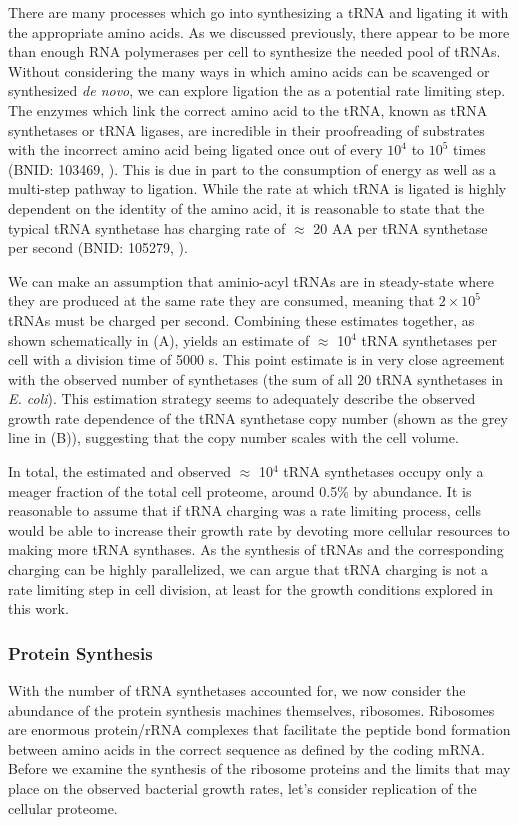 There  are many processes which go into synthesizing a tRNA and ligating it
with the appropriate amino acids. As we discussed previously, there
appear to be more than enough RNA polymerases per cell to synthesize the needed
pool of tRNAs. Without considering the many ways in which amino acids can be
scavenged or synthesized \textit{de novo}, we can explore ligation the as a potential rate limiting
step. The enzymes which link the correct amino acid to the tRNA, known as tRNA
synthetases or tRNA ligases, are incredible in their proofreading of substrates
with the incorrect amino acid being ligated once out of every $10^4$ to $10^5$
times (BNID: 103469, \cite{milo2010}). This is due in part to the consumption of
energy  as well as a multi-step pathway to ligation. While the rate at which
tRNA is ligated is highly dependent on the identity of the amino acid, it is
reasonable to state that the typical tRNA synthetase has charging rate of
$\approx$ 20 AA per tRNA synthetase per second (BNID: 105279, \cite{milo2010}).

We can make an assumption that aminio-acyl tRNAs are in steady-state where they
are produced at the same rate they are consumed, meaning that $2 \times 10^5$
tRNAs must be charged per second. Combining these estimates together, as shown schematically
in (A), yields an estimate of $\approx$ 10$^4$ tRNA
synthetases per cell with a division time of 5000 s. This point estimate is in
very close agreement with the observed number of synthetases (the sum of all 20
tRNA synthetases in \textit{E. coli}). This estimation strategy seems to
adequately describe the observed growth rate dependence of the tRNA synthetase copy
number (shown as the grey line in (B)), suggesting that
the copy number scales with the cell volume.

In total, the estimated and observed $\approx$ 10$^4$ tRNA synthetases occupy
only a meager fraction of the total cell proteome, around 0.5\% by abundance. It
is reasonable to assume that if tRNA charging was a rate limiting process, cells
would be able to increase their growth rate by devoting more cellular resources
to making more tRNA synthases. As the synthesis of tRNAs and the corresponding
charging can be highly parallelized, we can argue that tRNA charging is not a
rate limiting step in cell division, at least for the growth conditions explored
in this work.

\subsubsection{Protein Synthesis}
With the number of tRNA synthetases accounted for, we now consider the abundance
of the protein synthesis machines themselves, ribosomes. Ribosomes are enormous
protein/rRNA complexes that facilitate the peptide bond formation between amino
acids in the correct sequence as defined by the coding mRNA. Before we examine
the synthesis of the ribosome proteins and the limits that may place on the
observed bacterial growth rates, let's consider replication of the cellular
proteome.

